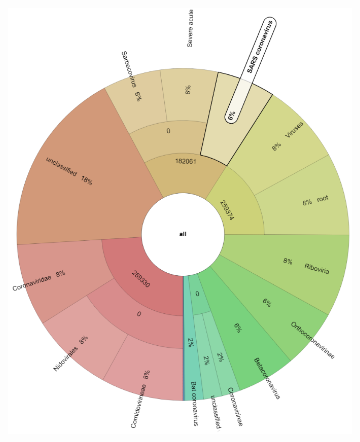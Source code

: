 \begin{figure}[H]
\begin{subfigure}[b]{0.3\textwidth}
        \includegraphics[width=1\textwidth]{figures/results/real/krona/krona-us-sSRR18300811.png}
        \label{fig:results:real:krona-us-b}
        \end{subfigure}
        \hfill
        \begin{subfigure}[b]{0.3\textwidth}

\end{subfigure}
\end{figure}
